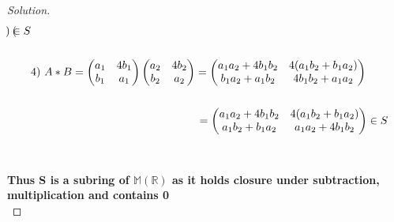 \documentclass[12pt]{article}
\begin{document}
\begin{proof}[Solution]
\begin{align*}
\begin{pmatrix}
		\end{pmatrix} \in S
		\\ \\
		&\text{4) } A*B = 
		\begin{pmatrix}
			a_1 & 4b_1 \\
			b_1 & a_1
		\end{pmatrix} 
		\begin{pmatrix}
			a_2 & 4b_2 \\
			b_2 & a_2
		\end{pmatrix} = 
		\begin{pmatrix}
			a_1a_2 + 4b_1b_2 & 4(a_1b_2 + b_1a_2) \\
			b_1a_2 + a_1b_2 & 4b_1b_2 + a_1a_2
		\end{pmatrix}
		\\ \\
		&\noindent \qquad \qquad \qquad \qquad \qquad \qquad \qquad \quad = 		
		\begin{pmatrix}
			a_1a_2 + 4b_1b_2 & 4(a_1b_2 + b_1a_2) \\
			a_1b_2 + b_1a_2 & a_1a_2 + 4b_1b_2
		\end{pmatrix} \in S
	\end{align*}
\\ \\
\textbf{Thus S is a subring of $\mathbb{M(R)}$ as it holds closure under subtraction, \\multiplication and contains 0} \\
\end{proof}
\newpage
\end{document}
